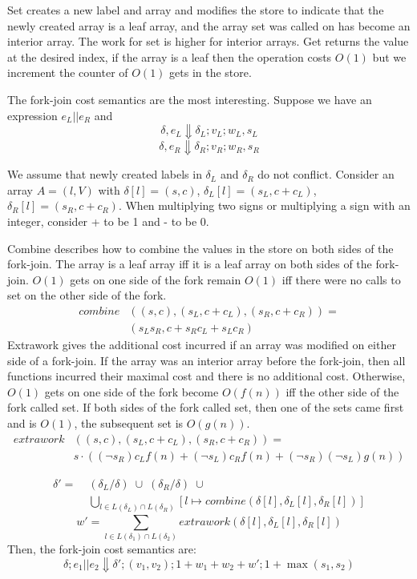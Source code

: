 \documentclass[preprint]{sigplanconf}
\begin{document}
Set creates a new label and array and modifies the store to indicate that the newly created array is a leaf array, and the array set was called on has become an interior array. The work for set is higher for interior arrays. Get returns the value at the desired index, if the array is a leaf then the operation costs $O(1)$ but we increment the counter of $O(1)$ gets in the store.

The fork-join cost semantics are the most interesting. Suppose we have an expression $e_L || e_R$ and
\[ \delta, e_L \Downarrow \delta_L; v_L; w_L, s_L \]
\[ \delta, e_R \Downarrow \delta_R; v_R; w_R, s_R \]

We assume that newly created labels in $\delta_L$ and $\delta_R$ do not conflict. Consider an array $A = (l, V)$ with $\delta[l] = (s,c)$, $\delta_L[l] = (s_L, c + c_L)$, $\delta_R[l] = (s_R, c + c_R)$. When multiplying two signs or multiplying a sign with an integer, consider + to be 1 and - to be 0. 

Combine describes how to combine the values in the store on both sides of the fork-join. The array is a leaf array iff it is a leaf array on both sides of the fork-join. $O(1)$ gets on one side of the fork remain $O(1)$ iff there were no calls to set on the other side of the fork.
\begin{equation*}
  \begin{aligned}
   combine&((s, c), (s_L, c + c_L), (s_R, c + c_R))= \\
   &(s_L s_R, c + s_R c_L + s_L c_R)
  \end{aligned}
\end{equation*}
Extrawork gives the additional cost incurred if an array was modified on either side of a fork-join. If the array was an interior array before the fork-join, then all functions incurred their maximal cost and there is no additional cost. Otherwise, $O(1)$ gets on one side of the fork become $O(f(n))$ iff the other side of the fork called set. If both sides of the fork called set, then one of the sets came first and is $O(1)$, the subsequent set is $O(g(n))$.
\begin{equation*}
  \begin{aligned}
  extrawork&((s, c), (s_L, c + c_L), (s_R, c + c_R)) = \\
  &s \cdot ( (\neg s_R) c_L f(n)  + (\neg s_L) c_R f(n) + (\neg s_R) (\neg s_L) g(n) )
 \end{aligned}
\end{equation*}
										
\begin{equation*}
  \begin{aligned}
  \delta' = \; &(\delta_L / \delta) \; \cup \; (\delta_R / \delta) \; \cup \\
               &\bigcup_{l \in L(\delta_L) \cap L(\delta_R)} [l \mapsto combine(\delta[l], \delta_L[l], \delta_R[l])]
  \end{aligned}
\end{equation*}
$$w' = \sum_{l \in L(\delta_1) \cap L(\delta_2)} extrawork(\delta[l], \delta_L[l], \delta_R[l])$$
Then, the fork-join cost semantics are:
$$\delta; e_1 || e_2 \Downarrow \delta'; (v_1, v_2); 1 + w_1 + w_2 + w'; 1 + \max(s_1, s_2)$$
\end{document}
